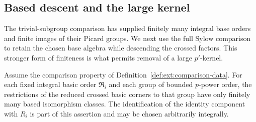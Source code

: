 \subsection{Based descent and the large kernel}

The trivial-subgroup comparison has supplied finitely many
integral base orders and finite images of their Picard groups.
We next use the full Sylow comparison to retain the chosen base
algebra while descending the crossed factors.  This stronger
form of finiteness is what permits removal of a large $p'$-kernel.

\begin{lemma}
\label{lem:ext:based-sylow}
Assume the comparison property of
Definition~\ref{def:ext:comparison-data}.  For each fixed integral
basic order $\mathfrak R_i$ and each group of bounded $p$-power
order, the restrictions of the reduced crossed basic corners to
that group have only finitely many based isomorphism classes.
The identification of the identity component with $R_i$ is part
of this assertion and may be chosen arbitrarily integrally.
\end{lemma}

